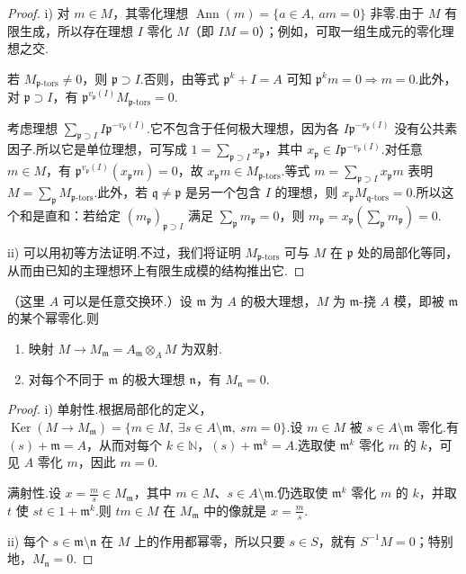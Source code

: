 \begin{proof}
i) 对 $m\in M$，其零化理想 $\operatorname{Ann}(m)=\{a\in A,\ am=0\}$ 非零.由于 $M$ 有限生成，所以存在理想 $I$ 零化 $M$（即 $IM=0$）；例如，可取一组生成元的零化理想之交.

若 $M_{\mathfrak p\text{-}\mathrm{tors}}\ne0$，则 $\mathfrak p\supset I$.否则，由等式 $\mathfrak p^k+I=A$ 可知 $\mathfrak p^km=0\Rightarrow m=0$.此外，对 $\mathfrak p\supset I$，有 $\mathfrak p^{v_{\mathfrak p}(I)}M_{\mathfrak p\text{-}\mathrm{tors}}=0$.

考虑理想 $\sum_{\mathfrak p\supset I}I\mathfrak p^{-v_{\mathfrak p}(I)}$.它不包含于任何极大理想，因为各 $I\mathfrak p^{-v_{\mathfrak p}(I)}$ 没有公共素因子.所以它是单位理想，可写成 $1=\sum_{\mathfrak p\supset I}x_{\mathfrak p}$，其中 $x_{\mathfrak p}\in I\mathfrak p^{-v_{\mathfrak p}(I)}$.对任意 $m\in M$，有 $\mathfrak p^{v_{\mathfrak p}(I)}(x_{\mathfrak p}m)=0$，故 $x_{\mathfrak p}m\in M_{\mathfrak p\text{-}\mathrm{tors}}$.等式 $m=\sum_{\mathfrak p\supset I}x_{\mathfrak p}m$ 表明 $M=\sum_{\mathfrak p}M_{\mathfrak p\text{-}\mathrm{tors}}$.此外，若 $\mathfrak q\ne\mathfrak p$ 是另一个包含 $I$ 的理想，则 $x_{\mathfrak p}M_{\mathfrak q\text{-}\mathrm{tors}}=0$.所以这个和是直和：若给定 $(m_{\mathfrak p})_{\mathfrak p\supset I}$ 满足 $\sum_{\mathfrak p}m_{\mathfrak p}=0$，则 $m_{\mathfrak p}=x_{\mathfrak p}(\sum_{\mathfrak p}m_{\mathfrak p})=0$.

ii) 可以用初等方法证明.不过，我们将证明 $M_{\mathfrak p\text{-}\mathrm{tors}}$ 可与 $M$ 在 $\mathfrak p$ 处的局部化等同，从而由已知的主理想环上有限生成模的结构推出它.
\end{proof}
\begin{lemma*}
（这里 $A$ 可以是任意交换环.）设 $\mathfrak m$ 为 $A$ 的极大理想，$M$ 为 $\mathfrak m$-挠 $A$ 模，即被 $\mathfrak m$ 的某个幂零化.则
\begin{enumerate}[label=\roman*)]
\item 映射 $M\longrightarrow M_{\mathfrak m}=A_{\mathfrak m}\otimes_A M$ 为双射.
\item 对每个不同于 $\mathfrak m$ 的极大理想 $\mathfrak n$，有 $M_{\mathfrak n}=0$.
\end{enumerate}
\end{lemma*}
\begin{proof}
i) 单射性.根据局部化的定义，$\operatorname{Ker}(M\longrightarrow M_{\mathfrak m})=\{m\in M,\ \exists s\in A\setminus\mathfrak m,\ sm=0\}$.设 $m\in M$ 被 $s\in A\setminus\mathfrak m$ 零化.有 $(s)+\mathfrak m=A$，从而对每个 $k\in\mathbb N$，$(s)+\mathfrak m^k=A$.选取使 $\mathfrak m^k$ 零化 $m$ 的 $k$，可见 $A$ 零化 $m$，因此 $m=0$.

满射性.设 $x=\frac ms\in M_{\mathfrak m}$，其中 $m\in M$、$s\in A\setminus\mathfrak m$.仍选取使 $\mathfrak m^k$ 零化 $m$ 的 $k$，并取 $t$ 使 $st\in1+\mathfrak m^k$.则 $tm\in M$ 在 $M_{\mathfrak m}$ 中的像就是 $x=\frac ms$.

ii) 每个 $s\in\mathfrak m\setminus\mathfrak n$ 在 $M$ 上的作用都幂零，所以只要 $s\in S$，就有 $S^{-1}M=0$；特别地，$M_{\mathfrak n}=0$.
\end{proof}
